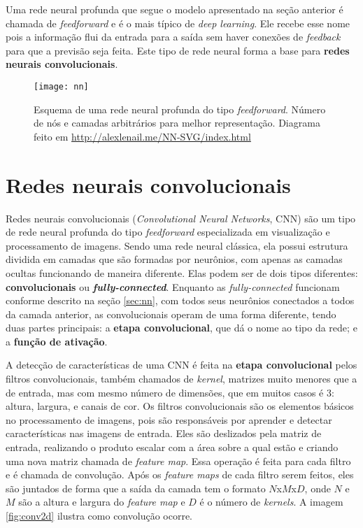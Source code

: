 Uma rede neural profunda que segue o modelo apresentado na seção anterior é chamada de \textit{feedforward} e é o mais típico de \textit{deep learning}.
Ele recebe esse nome pois a informação flui da entrada para a saída sem haver conexões de \textit{feedback} para que a previsão seja feita.
Este tipo de rede neural forma a base para \textbf{redes neurais convolucionais}.%

\begin{figure}[h!]
\texttt{[image: nn]}
\centering
\caption{Esquema de uma rede neural profunda do tipo \textit{feedforward}. Número de nós e camadas arbitrários para melhor representação. Diagrama feito em \url{http://alexlenail.me/NN-SVG/index.html}}
\end{figure}


\section{Redes neurais convolucionais}
\label{sec:cnn}

Redes neurais convolucionais (\textit{Convolutional Neural Networks}, CNN) são um tipo de rede neural profunda do tipo \textit{feedforward} especializada em visualização e processamento de imagens.
Sendo uma rede neural clássica, ela possui estrutura dividida em camadas que são formadas por neurônios, com apenas as camadas ocultas funcionando de maneira diferente.
Elas podem ser de dois tipos diferentes:
\textbf{convolucionais} ou \textbf{\textit{fully-connected}}.
Enquanto as \textit{fully-connected} funcionam conforme descrito na seção \ref{sec:nn}, com todos seus neurônios conectados a todos da camada anterior, as convolucionais operam de uma forma diferente, tendo duas partes principais:
a \textbf{etapa convolucional}, que dá o nome ao tipo da rede;
e a \textbf{função de ativação}.

A detecção de características de uma CNN é feita na \textbf{etapa convolucional} pelos filtros convolucionais, também chamados de \textit{kernel}, matrizes muito menores que a de entrada, mas com mesmo número de dimensões, que em muitos casos é 3: altura, largura, e canais de cor.
Os filtros convolucionais são os elementos básicos no processamento de imagens, pois são responsáveis por aprender e detectar características nas imagens de entrada.
Eles são deslizados pela matriz de entrada, realizando o produto escalar com a área sobre a qual estão e criando uma nova matriz chamada de \textit{feature map}.
Essa operação é feita para cada filtro e é chamada de convolução.
Após os \textit{feature maps} de cada filtro serem feitos, eles são juntados de forma que a saída da camada tem o formato $N$x$M$x$D$, onde $N$ e $M$ são a altura e largura do \textit{feature map} e $D$ é o número de \textit{kernels}.
A imagem \ref{fig:conv2d} ilustra como convolução ocorre.

